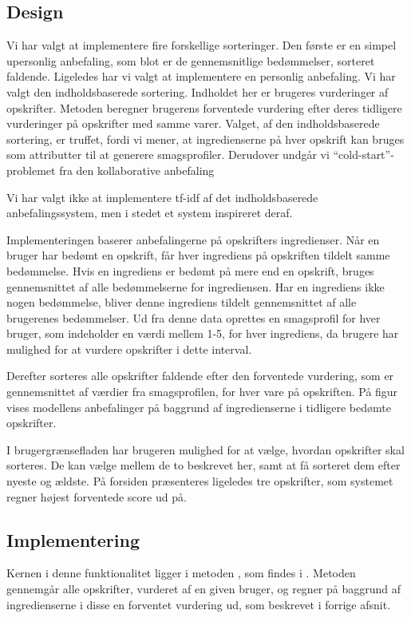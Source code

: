 \subsection{Design}
Vi har valgt at implementere fire forskellige sorteringer.
Den første er en simpel upersonlig anbefaling, som blot er de gennemsnitlige bedømmelser, sorteret faldende.
Ligeledes har vi valgt at implementere en personlig anbefaling.
Vi har valgt den indholdsbaserede sortering.
Indholdet her er brugeres vurderinger af opskrifter.
Metoden beregner brugerens forventede vurdering efter deres tidligere vurderinger på opskrifter med samme varer.
Valget, af den indholdsbaserede sortering, er truffet, fordi vi mener, at ingredienserne på hver opskrift kan bruges som attributter til at generere smagsprofiler.
Derudover undgår vi ``cold-start''-problemet fra den kollaborative anbefaling

Vi har valgt ikke at implementere tf-idf af det indholdsbaserede anbefalingssystem, men i stedet et system inspireret deraf. 

Implementeringen baserer anbefalingerne på opskrifters ingredienser.
Når en bruger har bedømt en opskrift, får hver ingrediens på opskriften tildelt samme bedømmelse.
Hvis en ingrediens er bedømt på mere end en opskrift, bruges gennemsnittet af alle bedømmelserne for ingrediensen.
Har en ingrediens ikke nogen bedømmelse, bliver denne ingrediens tildelt gennemsnittet af alle brugerenes bedømmelser.
Ud fra denne data oprettes en smagsprofil for hver bruger, som indeholder en værdi mellem 1-5, for hver ingrediens, da brugere har mulighed for at vurdere opskrifter i dette interval.

Derefter sorteres alle opskrifter faldende efter den forventede vurdering, som er gennemsnittet af værdier fra smagsprofilen, for hver vare på opskriften. 
På figur  vises modellens anbefalinger på baggrund af ingredienserne i tidligere bedømte opskrifter.


I brugergrænsefladen har brugeren mulighed for at vælge, hvordan opskrifter skal sorteres.
De kan vælge mellem de to beskrevet her, samt at få sorteret dem efter nyeste og ældste.
På forsiden præsenteres ligeledes tre opskrifter, som systemet regner højest forventede score ud på.

\subsection{Implementering}
Kernen i denne funktionalitet ligger i metoden , som findes i .
Metoden gennemgår alle opskrifter, vurderet af en given bruger, og regner på baggrund af ingredienserne i disse en forventet vurdering ud, som beskrevet i forrige afsnit.

